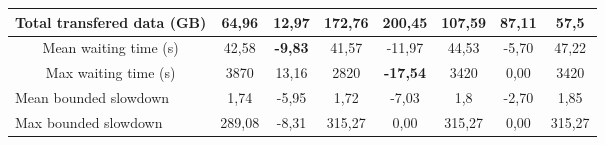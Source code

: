 \begin{table}[]
\begin{tabular}{cccccccc}
\multicolumn{1}{|c|}{Total transfered data (GB)} & \multicolumn{1}{c|}{64,96}          & \multicolumn{1}{c|}{\textbf{12,97}} & \multicolumn{1}{c|}{172,76}         & \multicolumn{1}{c|}{200,45}          & \multicolumn{1}{c|}{107,59}         & \multicolumn{1}{c|}{87,11}         & \multicolumn{1}{c|}{57,5}              \\ \hline
\multicolumn{1}{|c|}{Mean waiting time (s)}      & \multicolumn{1}{c|}{42,58}          & \multicolumn{1}{c|}{\textbf{-9,83}} & \multicolumn{1}{c|}{41,57}          & \multicolumn{1}{c|}{-11,97}          & \multicolumn{1}{c|}{44,53}          & \multicolumn{1}{c|}{-5,70}         & \multicolumn{1}{c|}{47,22}             \\ \hline
\multicolumn{1}{|c|}{Max waiting time (s)}       & \multicolumn{1}{c|}{3870}           & \multicolumn{1}{c|}{13,16}          & \multicolumn{1}{c|}{2820}           & \multicolumn{1}{c|}{\textbf{-17,54}} & \multicolumn{1}{c|}{3420}           & \multicolumn{1}{c|}{0,00}          & \multicolumn{1}{c|}{3420}              \\ \hline
\multicolumn{1}{|l|}{Mean bounded slowdown}      & \multicolumn{1}{c|}{1,74}           & \multicolumn{1}{c|}{-5,95}          & \multicolumn{1}{c|}{1,72}           & \multicolumn{1}{c|}{-7,03}           & \multicolumn{1}{c|}{1,8}            & \multicolumn{1}{c|}{-2,70}         & \multicolumn{1}{c|}{1,85}              \\ \hline
\multicolumn{1}{|l|}{Max bounded slowdown}       & \multicolumn{1}{c|}{289,08}         & \multicolumn{1}{c|}{-8,31}          & \multicolumn{1}{c|}{315,27}         & \multicolumn{1}{c|}{0,00}            & \multicolumn{1}{c|}{315,27}         & \multicolumn{1}{c|}{0,00}          & \multicolumn{1}{c|}{315,27}            \\ \hline
\end{tabular}
\end{table}